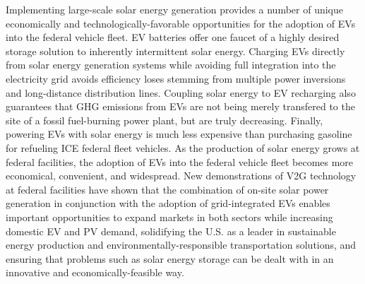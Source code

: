 Implementing large-scale solar energy generation provides a number of unique economically and technologically-favorable opportunities for the adoption of EVs into the federal vehicle fleet. EV batteries offer one faucet of a highly desired storage solution to inherently intermittent solar energy. Charging EVs directly from solar energy generation systems while avoiding full integration into the electricity grid avoids efficiency loses stemming from multiple power inversions and long-distance distribution lines. Coupling solar energy to EV recharging also guarantees that GHG emissions from EVs are not being merely transfered to the site of a fossil fuel-burning power plant, but are truly decreasing. Finally, powering EVs with solar energy is much less expensive than purchasing gasoline for refueling ICE federal fleet vehicles. As the production of solar energy grows at federal facilities, the adoption of EVs into the federal vehicle fleet becomes more economical, convenient, and widespread. New demonstrations of V2G technology at federal facilities have shown that the combination of on-site solar power generation in conjunction with the adoption of grid-integrated EVs enables important opportunities to expand markets in both sectors while increasing domestic EV and PV demand, solidifying the U.S. as a leader in sustainable energy production and environmentally-responsible transportation solutions, and ensuring that problems such as solar energy storage can be dealt with in an innovative and economically-feasible way.

